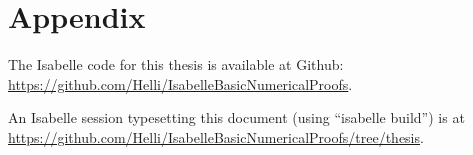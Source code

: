 \documentclass[11pt,a4paper,bibtotoc,idxtotoc,BCOR15mm,DIV10]{scrbook}
\begin{document}





\backmatter
\appendix
\chapter {Appendix}

The Isabelle code for this thesis is available at Github:
\url{https://github.com/Helli/IsabelleBasicNumericalProofs}.

An Isabelle session typesetting this document (using ``isabelle build'') is at \url{https://github.com/Helli/IsabelleBasicNumericalProofs/tree/thesis}.
\end{document}
